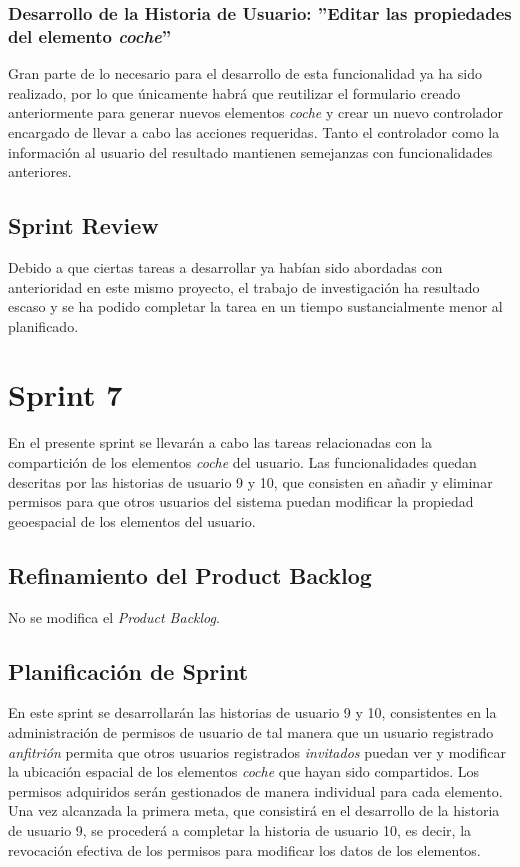 	\subsubsection{Desarrollo de la Historia de Usuario: ''Editar las propiedades del elemento \textit{coche}'' }
		Gran parte de lo necesario para el desarrollo de esta funcionalidad ya ha sido realizado, por lo que únicamente habrá que reutilizar el formulario creado anteriormente para generar nuevos elementos \textit{coche} y crear un nuevo controlador encargado de llevar a cabo las acciones requeridas. Tanto el controlador como la información al usuario del resultado mantienen semejanzas con funcionalidades anteriores. 
		
	\subsection{Sprint Review}
	Debido a que ciertas tareas a desarrollar ya habían sido abordadas con anterioridad en este mismo proyecto, el trabajo de investigación ha resultado escaso y se ha podido completar la tarea en un tiempo sustancialmente menor al planificado.

\section{Sprint 7}
En el presente sprint se llevarán a cabo las tareas relacionadas con la compartición de los elementos \textit{coche} del usuario. Las funcionalidades quedan descritas por las historias de usuario 9 y 10, que consisten en añadir y eliminar permisos para que otros usuarios del sistema puedan modificar la propiedad geoespacial de los elementos del usuario.

	\subsection{Refinamiento del Product Backlog}
	No se modifica el \textit{Product Backlog}.
	
	\subsection{Planificación de Sprint}
	En este sprint se desarrollarán las historias de usuario 9 y 10, consistentes en la administración de permisos de usuario de tal manera que un usuario registrado \textit{anfitrión} permita que otros usuarios registrados \textit{invitados} puedan ver y modificar la ubicación espacial de los elementos \textit{coche} que hayan sido compartidos. Los permisos adquiridos serán gestionados de manera individual para cada elemento.
	Una vez alcanzada la primera meta, que consistirá en el desarrollo de la historia de usuario 9, se procederá a completar la historia de usuario 10, es decir, la revocación efectiva de los permisos para modificar los datos de los elementos.
	
